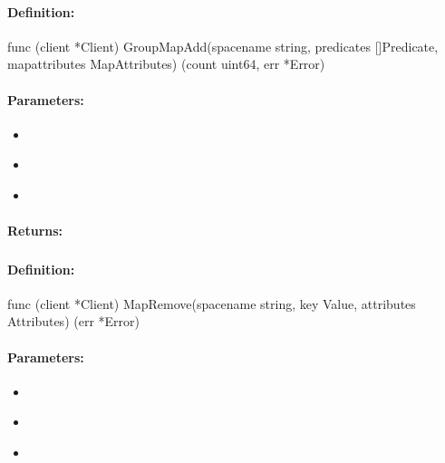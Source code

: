 \paragraph{Definition:}
\begin{gocode}
func (client *Client) GroupMapAdd(spacename string, predicates []Predicate, mapattributes MapAttributes) (count uint64, err *Error)
\end{gocode}

\paragraph{Parameters:}
\begin{itemize}[noitemsep]
\item {}\\

\item {}\\

\item {}\\

\end{itemize}

\paragraph{Returns:}


\pagebreak
\subsubsection{}
\label{api:Go:MapRemove}


\paragraph{Definition:}
\begin{gocode}
func (client *Client) MapRemove(spacename string, key Value, attributes Attributes) (err *Error)
\end{gocode}

\paragraph{Parameters:}
\begin{itemize}[noitemsep]
\item {}\\

\item {}\\

\item {}\\

\end{itemize}

